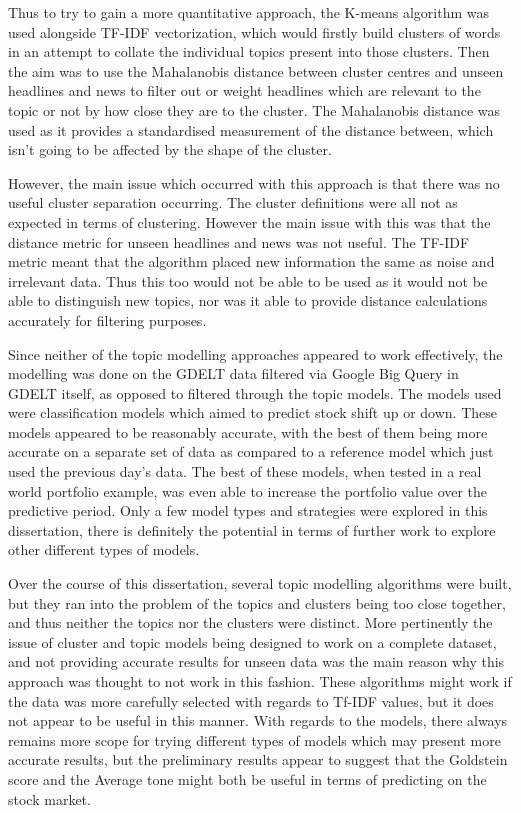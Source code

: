 Thus to try to gain a more quantitative approach, the K-means algorithm was used alongside TF-IDF vectorization, which would  firstly build clusters of words in an attempt to collate the individual topics present into those clusters. Then the aim was to use the Mahalanobis distance between cluster centres and unseen headlines and news to filter out or weight headlines which are relevant to the topic or not by how close they are to the cluster. The Mahalanobis distance was used as it provides a standardised measurement of the distance between, which isn't going to be affected by the shape of the cluster. 

However, the main issue which occurred with this approach is that there was no useful cluster separation occurring. The cluster definitions were all not as expected in terms of clustering. However the main issue with this was that the distance metric for unseen headlines and news was not useful. The TF-IDF metric meant that the algorithm placed new information the same as noise and irrelevant data. Thus this too would not be able to be used as it would not be able to distinguish new topics, nor was it able to provide distance calculations accurately for filtering purposes.

Since neither of the topic modelling approaches appeared to work effectively, the modelling was done on the GDELT data filtered via Google Big Query in GDELT itself, as opposed to filtered through the topic models. The models used were classification models which aimed to predict stock shift up or down. These models appeared to be reasonably accurate, with the best of them being more accurate on a separate set of data as compared to a reference model which just used the previous day's data. The best of these models, when tested in a real world portfolio example, was even able to increase the portfolio value over the predictive period. Only a few model types and strategies were explored in this dissertation, there is definitely the potential in terms of further work to explore other different types of models.

Over the course of this dissertation, several topic modelling algorithms were built, but they ran into the problem of the topics and clusters being too close together, and thus neither the topics nor the clusters were distinct. More pertinently the issue of cluster and topic models being designed to work on a complete dataset, and not providing accurate results for unseen data was the main reason why this approach was thought to not work in this fashion. These algorithms might work if the data was more carefully selected with regards to Tf-IDF values, but it does not appear to be useful in this manner. With regards to the models, there always remains more scope for trying different types of models which may present more accurate results, but the preliminary results appear to suggest that the Goldstein score and the Average tone might both be useful in terms of predicting on the stock market.


